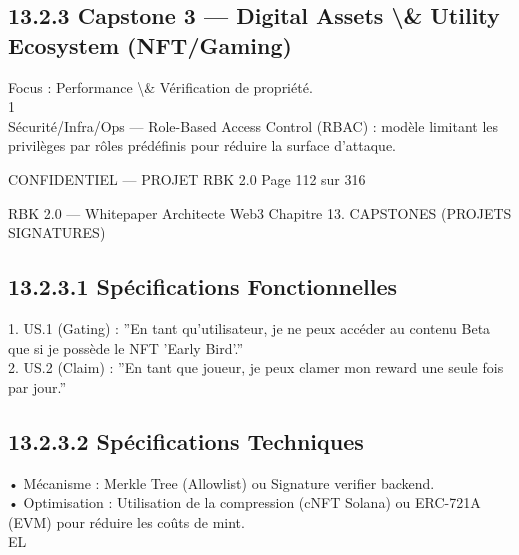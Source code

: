 \documentclass[12pt,landscape,a4paper]{article}
\newenvironment{confidential}
{\begin{tcolorbox}[
    colback=rbkred!5!white,
    colframe=rbkred!75!black,
    title=CONFIDENTIEL,
    fonttitle=\bfseries\color{white},
    coltitle=rbkred!75!black,
    breakable,
    enhanced,
    frame hidden,
    borderline west={2pt}{0pt}{rbkred!75!black}
]}
{\end{tcolorbox}}
\begin{document}
\subsection{13.2.3 Capstone 3 — Digital Assets \textbackslash{}& Utility Ecosystem (NFT/Gaming)}
Focus : Performance \textbackslash{}& Vérification de propriété.\\
1\\
Sécurité/Infra/Ops — Role-Based Access Control (RBAC) : modèle limitant les privilèges par rôles prédéfinis pour réduire la surface d’attaque.\\
\vspace{0.5em}
\vspace{0.5em}
\vspace{0.5em}
\vspace{0.5em}
\begin{confidential}CONFIDENTIEL — PROJET RBK 2.0                                             Page 112 sur 316\end{confidential}
RBK 2.0 — Whitepaper Architecte Web3                                                     Chapitre 13. CAPSTONES (PROJETS SIGNATURES)\\
\vspace{0.5em}
\vspace{0.5em}
\subsection{13.2.3.1 Spécifications Fonctionnelles}
\vspace{0.5em}
1. US.1 (Gating) : ”En tant qu’utilisateur, je ne peux accéder au contenu Beta que si je possède le NFT ’Early Bird’.”\\
\vspace{0.5em}
2. US.2 (Claim) : ”En tant que joueur, je peux clamer mon reward une seule fois par jour.”\\
\vspace{0.5em}
\subsection{13.2.3.2 Spécifications Techniques}
\vspace{0.5em}
• Mécanisme : Merkle Tree (Allowlist) ou Signature verifier backend.\\
\vspace{0.5em}
• Optimisation : Utilisation de la compression (cNFT Solana) ou ERC-721A (EVM) pour réduire les coûts de mint.\\
\vspace{0.5em}
\vspace{0.5em}
\vspace{0.5em}
\vspace{0.5em}
EL\\
\end{document}

